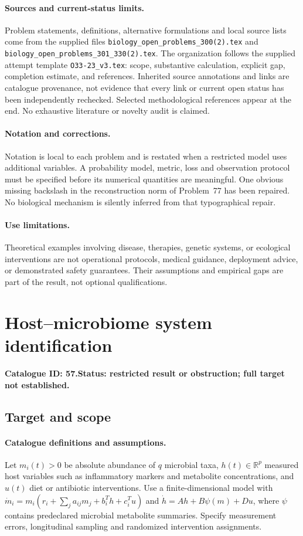 \documentclass[11pt]{article}
\newcommand{\R}{\mathbb R}
\providecommand{\R}{\mathbb R}
\begin{document}
\paragraph{Sources and current-status limits.}
Problem statements, definitions, alternative formulations and local source lists
come from the supplied files
\texttt{biology\_open\_problems\_300(2).tex} and
\texttt{biology\_open\_problems\_301\_330(2).tex}.
The organization follows the supplied attempt template
\texttt{O33-23\_v3.tex}: scope, substantive calculation, explicit gap,
completion estimate, and references. Inherited source annotations and links are
catalogue provenance, not evidence that every link or current open status has
been independently rechecked. Selected methodological references appear at the
end. No exhaustive literature or novelty audit is claimed.

\paragraph{Notation and corrections.}
Notation is local to each problem and is restated when a restricted model uses
additional variables. A probability model, metric, loss and observation protocol
must be specified before its numerical quantities are meaningful. One obvious
missing backslash in the reconstruction norm of Problem~77 has been repaired.
No biological mechanism is silently inferred from that typographical repair.

\paragraph{Use limitations.}
Theoretical examples involving disease, therapies, genetic systems, or ecological
interventions are not operational protocols, medical guidance, deployment advice,
or demonstrated safety guarantees. Their assumptions and empirical gaps are part
of the result, not optional qualifications.

\setcounter{section}{56}
\section{Host--microbiome system identification}
\label{prob:057}
\noindent\textbf{Catalogue ID: 57.}\quad \textbf{Status: restricted result or obstruction; full target not established.}
\subsection{Target and scope}
\paragraph{Catalogue definitions and assumptions.}
Let $m_i(t)>0$ be absolute abundance of $q$ microbial taxa, $h(t)\in\R^p$ measured host variables such as inflammatory markers and metabolite concentrations, and $u(t)$ diet or antibiotic interventions. Use a finite-dimensional model with $\dot m_i=m_i(r_i+\sum_j a_{ij}m_j+b_i^T h+c_i^T u)$ and $\dot h=Ah+B\psi(m)+Du$, where $\psi$ contains predeclared microbial metabolite summaries. Specify measurement errors, longitudinal sampling and randomized intervention assignments.
\end{document}
